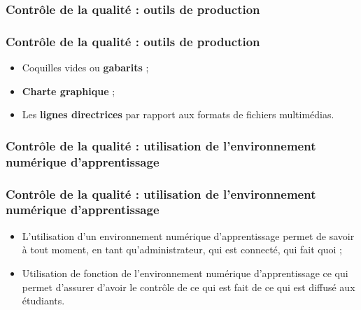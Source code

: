 					\subsubsection{Contrôle de la qualité : outils de production} 
							\begin{frame}
							\frametitle{Contrôle de la qualité : outils de production}
                        			
							\begin{itemize}
							
							\item Coquilles vides ou \textbf{gabarits} ;
							\item \textbf{Charte graphique} ;
							\item Les \textbf{lignes directrices} par rapport aux formats de fichiers multimédias.
												
							\end{itemize}						
					\end{frame}	
					\subsubsection{Contrôle de la qualité : utilisation de l'environnement numérique d'apprentissage} 
							\begin{frame}
							\frametitle{Contrôle de la qualité : utilisation de l'environnement numérique d'apprentissage}
                        			
							\begin{itemize}
							\item L’utilisation d'un environnement numérique d'apprentissage permet de savoir à tout moment, en tant qu’administrateur, qui est connecté, qui fait quoi ;
							\item Utilisation de fonction de l'environnement numérique d'apprentissage ce qui permet d’assurer d’avoir le contrôle de ce qui est fait de ce qui est diffusé aux étudiants.
							\end{itemize}						
					\end{frame}	
